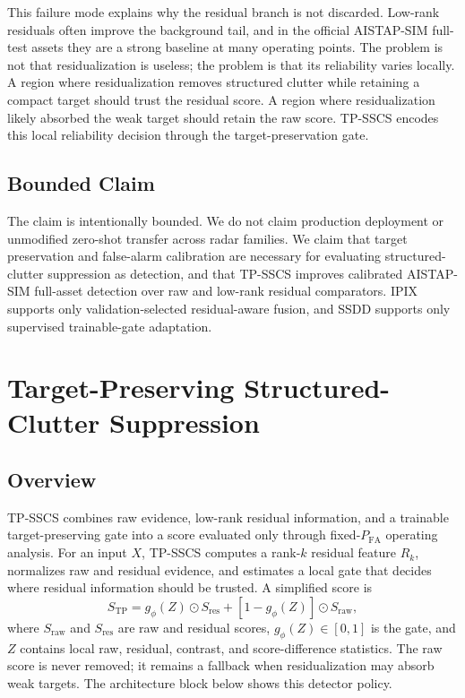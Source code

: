 \documentclass[journal]{IEEEtran}
\begin{document}
This failure mode explains why the residual branch is not discarded. Low-rank residuals often improve the background tail, and in the official AISTAP-SIM full-test assets they are a strong baseline at many operating points. The problem is not that residualization is useless; the problem is that its reliability varies locally. A region where residualization removes structured clutter while retaining a compact target should trust the residual score. A region where residualization likely absorbed the weak target should retain the raw score. TP-SSCS encodes this local reliability decision through the target-preservation gate.

\subsection{Bounded Claim}

The claim is intentionally bounded. We do not claim production deployment or unmodified zero-shot transfer across radar families. We claim that target preservation and false-alarm calibration are necessary for evaluating structured-clutter suppression as detection, and that TP-SSCS improves calibrated AISTAP-SIM full-asset detection over raw and low-rank residual comparators. IPIX supports only validation-selected residual-aware fusion, and SSDD supports only supervised trainable-gate adaptation.

\section{Target-Preserving Structured-Clutter Suppression}

\subsection{Overview}

TP-SSCS combines raw evidence, low-rank residual information, and a trainable target-preserving gate into a score evaluated only through fixed-$P_{\mathrm{FA}}$ operating analysis. For an input $X$, TP-SSCS computes a rank-$k$ residual feature $R_k$, normalizes raw and residual evidence, and estimates a local gate that decides where residual information should be trusted. A simplified score is
\begin{equation}
    S_{\mathrm{TP}} = g_\phi(Z) \odot S_{\mathrm{res}} +
    [1 - g_\phi(Z)] \odot S_{\mathrm{raw}},
\end{equation}
where $S_{\mathrm{raw}}$ and $S_{\mathrm{res}}$ are raw and residual scores, $g_\phi(Z)\in[0,1]$ is the gate, and $Z$ contains local raw, residual, contrast, and score-difference statistics. The raw score is never removed; it remains a fallback when residualization may absorb weak targets. The architecture block below shows this detector policy.
\end{document}
